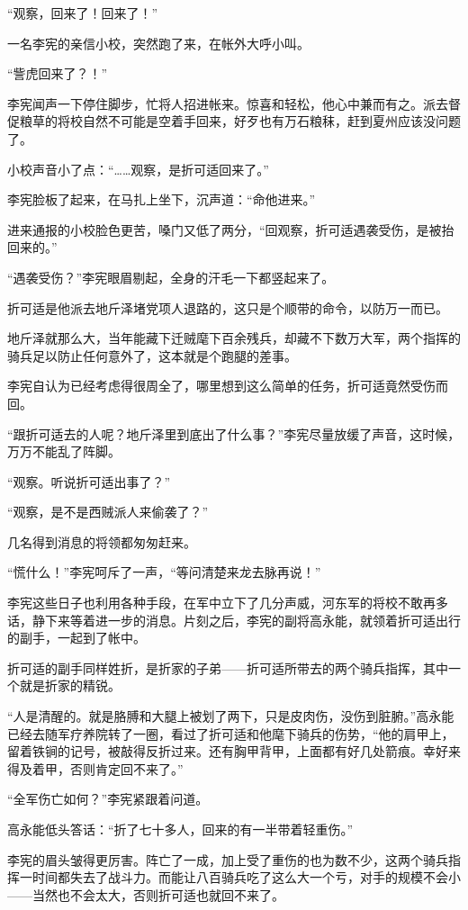 “观察，回来了！回来了！”

一名李宪的亲信小校，突然跑了来，在帐外大呼小叫。

“訾虎回来了？！”

李宪闻声一下停住脚步，忙将人招进帐来。惊喜和轻松，他心中兼而有之。派去督促粮草的将校自然不可能是空着手回来，好歹也有万石粮秣，赶到夏州应该没问题了。

小校声音小了点：“……观察，是折可适回来了。”

李宪脸板了起来，在马扎上坐下，沉声道：“命他进来。”

进来通报的小校脸色更苦，嗓门又低了两分，“回观察，折可适遇袭受伤，是被抬回来的。”

“遇袭受伤？”李宪眼眉剔起，全身的汗毛一下都竖起来了。

折可适是他派去地斤泽堵党项人退路的，这只是个顺带的命令，以防万一而已。

地斤泽就那么大，当年能藏下迁贼麾下百余残兵，却藏不下数万大军，两个指挥的骑兵足以防止任何意外了，这本就是个跑腿的差事。

李宪自认为已经考虑得很周全了，哪里想到这么简单的任务，折可适竟然受伤而回。

“跟折可适去的人呢？地斤泽里到底出了什么事？”李宪尽量放缓了声音，这时候，万万不能乱了阵脚。

“观察。听说折可适出事了？”

“观察，是不是西贼派人来偷袭了？”

几名得到消息的将领都匆匆赶来。

“慌什么！”李宪呵斥了一声，“等问清楚来龙去脉再说！”

李宪这些日子也利用各种手段，在军中立下了几分声威，河东军的将校不敢再多话，静下来等着进一步的消息。片刻之后，李宪的副将高永能，就领着折可适出行的副手，一起到了帐中。

折可适的副手同样姓折，是折家的子弟——折可适所带去的两个骑兵指挥，其中一个就是折家的精锐。

“人是清醒的。就是胳膊和大腿上被划了两下，只是皮肉伤，没伤到脏腑。”高永能已经去随军疗养院转了一圈，看过了折可适和他麾下骑兵的伤势，“他的肩甲上，留着铁锏的记号，被敲得反折过来。还有胸甲背甲，上面都有好几处箭痕。幸好来得及着甲，否则肯定回不来了。”

“全军伤亡如何？”李宪紧跟着问道。

高永能低头答话：“折了七十多人，回来的有一半带着轻重伤。”

李宪的眉头皱得更厉害。阵亡了一成，加上受了重伤的也为数不少，这两个骑兵指挥一时间都失去了战斗力。而能让八百骑兵吃了这么大一个亏，对手的规模不会小——当然也不会太大，否则折可适也就回不来了。

